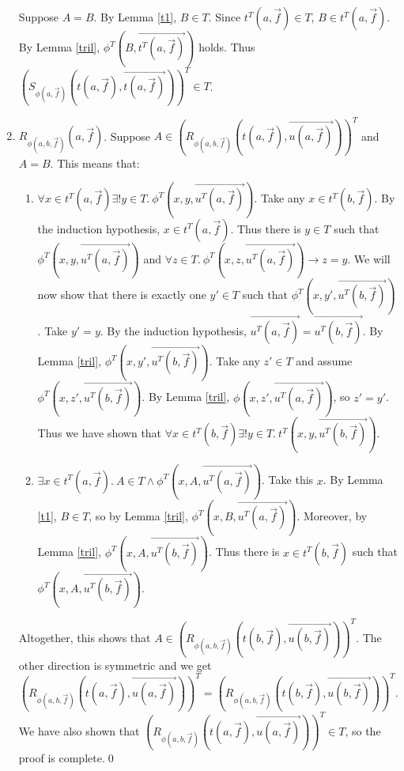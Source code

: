 \documentclass{LMCS}
\begin{document}
\begin{enumerate}[$\bullet$]
Suppose $A = B$. By Lemma \ref{t1}, $B \in T$. Since $t^T(a, \vec{f}) \in T$, $B \in t^T(a, \vec{f})$. By
Lemma \ref{tril}, $\phi^T(B, \overrightarrow{t^T(a, \vec{f})})$ holds. Thus $(S_{\phi(a,
\vec{f})}(t(a, \vec{f}), \overrightarrow{t(a, \vec{f})}))^T \in T$. 
\item $R_{\phi(a, b, \vec{f})}(a, \vec{f})$. Suppose $A \in (R_{\phi(a, b,
\vec{f})}(t(a, \vec{f}), \overrightarrow{u(a, \vec{f})}))^T$ and $A = B$. This means that:
\begin{enumerate}[$-$]
\item $\forall x \in t^T(a, \vec{f}) \exists !y \in T.\ \phi^T(x, y, \overrightarrow{u^T(a, \vec{f})})$.
Take any $x \in t^T(b, \vec{f})$. By the induction hypothesis, $x \in t^T(a,
\vec{f})$. Thus there is $y \in T$ such that $\phi^T(x, y,
\overrightarrow{u^T(a, \vec{f})})$ and $\forall z \in T.\ \phi^T(x, z, \overrightarrow{u^T(a,
\vec{f})}) \to z = y$. We will now show that there is exactly one $y' \in T$
such that $\phi^T(x, y', \overrightarrow{u^T(b, \vec{f})})$. Take $y' = y$. 
By the induction hypothesis, $\overrightarrow{u^T(a, \vec{f})} = \overrightarrow{u^T(b, \vec{f})}$. 
By Lemma \ref{tril}, $\phi^T(x, y', \overrightarrow{u^T(b, \vec{f})})$.
Take any $z' \in T$ and assume $\phi^T(x, z', \overrightarrow{u^T(b, \vec{f})})$. By Lemma
\ref{tril}, $\phi(x, z', \overrightarrow{u^T(a, \vec{f})})$, so $z' = y'$. Thus we have
shown that $\forall x \in t^T(b, \vec{f}) \exists !y \in T.\ t^T(x, y,
\overrightarrow{u^T(b, \vec{f})})$. 
\item $\exists x \in t^T(a, \vec{f}).\ A \in T \land \phi^T(x, A, \overrightarrow{u^T(a, \vec{f})})$. Take this $x$.
By Lemma \ref{t1}, $B \in T$, so by Lemma \ref{tril}, $\phi^T(x, B, \overrightarrow{u^T(a, \vec{f})})$.  
Moreover, by Lemma \ref{tril}, $\phi^T(x, A, \overrightarrow{u^T(b, \vec{f})})$. 
Thus there is $x \in t^T(b, \vec{f})$ such that $\phi^T(x, A,
\overrightarrow{u^T(b, \vec{f})})$.
\end{enumerate}
Altogether, this shows that $A \in (R_{\phi(a, b, \vec{f})}(
t(b, \vec{f}), \overrightarrow{u(b, \vec{f})}))^T$. The other direction is symmetric and we get
$(R_{\phi(a, b, \vec{f})}(t(a, \vec{f}), \overrightarrow{u(a, \vec{f})}))^T =
(R_{\phi(a, b, \vec{f})}(t(b, \vec{f}), \overrightarrow{u(b, \vec{f})}))^T$. We have
also shown that $(R_{\phi(a, b, \vec{f})}(t(a, \vec{f}), \overrightarrow{u(a,
\vec{f})}))^T \in T$, so the proof is complete.\qed
\end{enumerate}
\end{document}
